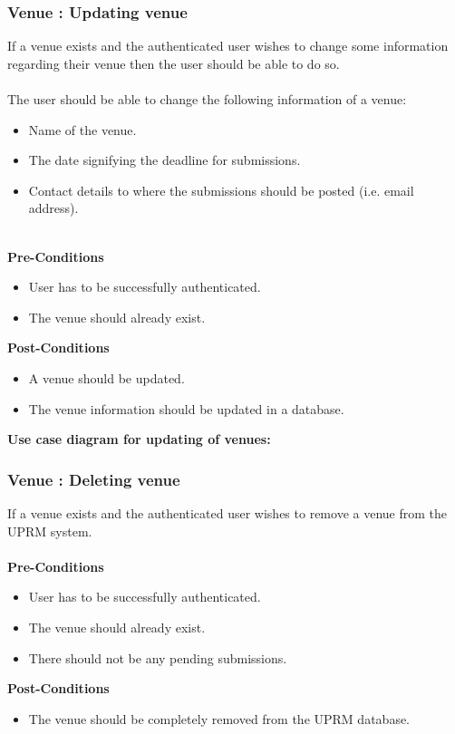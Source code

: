 \subsubsection{Venue : Updating venue}
If a venue exists and the authenticated user wishes to change some information regarding their venue then the user should be able to do so. \\ \\
The user should be able to change the following information of a venue: 
\begin{itemize}
	\item Name of the venue.
	\item The date signifying the deadline for submissions.
	\item Contact details to where the submissions should be posted (i.e. email address).\\ \\
\end{itemize}
\textbf{Pre-Conditions}
\begin{itemize}
	\item User has to be successfully authenticated.
	\item The venue should already exist.\\
\end{itemize}
\textbf{Post-Conditions}
\begin{itemize}
	\item A venue should be updated.
	\item The venue information should be updated in a database.\\
\end{itemize}
\textbf{Use case diagram for updating of venues: }\\
\centerline{}

\subsubsection{Venue : Deleting venue}
If a venue exists and the authenticated user wishes to remove a venue from the UPRM system. \\ \\
\textbf{Pre-Conditions}
\begin{itemize}
	\item User has to be successfully authenticated.
	\item The venue should already exist.
	\item There should not be any pending submissions.\\
\end{itemize}
\textbf{Post-Conditions}
\begin{itemize}
	\item The venue should be completely removed from the UPRM database.\\
\end{itemize}


